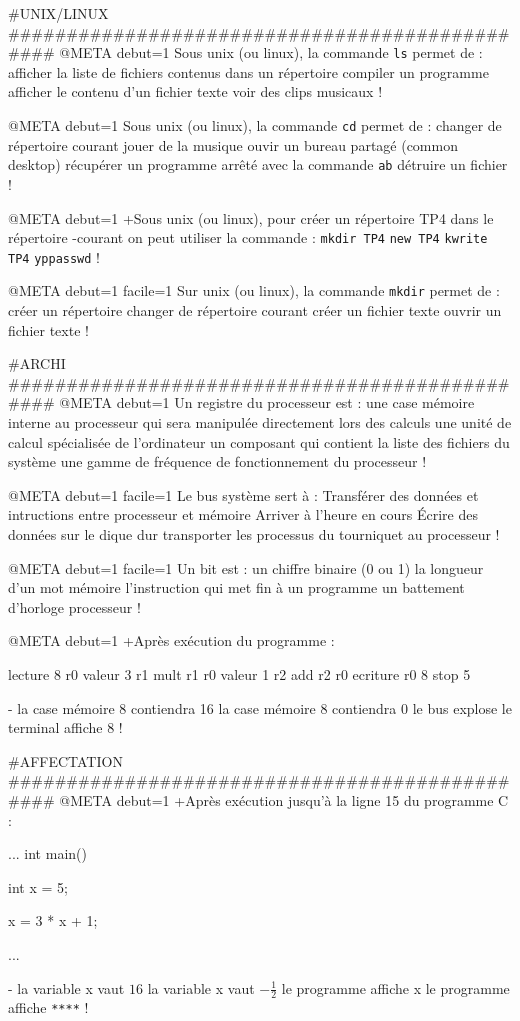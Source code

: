 #UNIX/LINUX ###############################################
@META debut=1
Sous unix (ou linux), la commande \verb|ls| permet de :
 afficher la liste de fichiers contenus dans un répertoire
 compiler un programme
 afficher le contenu d'un fichier texte
 voir des clips musicaux
!

@META debut=1
Sous unix (ou linux), la commande \verb|cd| permet de :
 changer de répertoire courant
 jouer de la musique
 ouvir un bureau partagé (common desktop)
 récupérer un programme arrêté avec la commande \verb|ab|
 détruire un fichier
!

@META debut=1
+Sous unix (ou linux), pour créer un répertoire TP4 dans le répertoire
-courant on peut utiliser la commande :
 \verb+mkdir TP4+
 \verb+new TP4+
 \verb+kwrite TP4+
 \verb+yppasswd+
!

@META debut=1 facile=1
Sur unix (ou linux), la commande \verb|mkdir| permet de :
  créer un répertoire
  changer de répertoire courant
  créer un fichier texte
  ouvrir un fichier texte
!



#ARCHI ###############################################
@META debut=1
Un registre du processeur est :
 une case mémoire interne au processeur qui sera manipulée directement lors des calculs
 une unité de calcul spécialisée de l'ordinateur
 un composant qui contient la liste des fichiers du système
 une gamme de fréquence de fonctionnement du processeur
!

@META debut=1 facile=1
Le bus système sert à :
 Transférer des données et intructions entre processeur et mémoire
 Arriver à l'heure en cours
 Écrire des données sur le dique dur
 transporter les processus du tourniquet au processeur
!

@META debut=1 facile=1
Un bit est :
 un chiffre binaire (0 ou 1)
 la longueur d'un mot mémoire
 l'instruction qui met fin à un programme
 un battement d'horloge processeur
!


@META debut=1
+Après exécution du programme :
\begin{listing}{1}
lecture 8 r0
valeur 3 r1
mult r1 r0
valeur 1 r2
add r2 r0
ecriture r0 8
stop
5
\end{listing}
-
 la case mémoire 8 contiendra 16
 la case mémoire 8 contiendra 0
 le bus explose
 le terminal affiche 8
!

#AFFECTATION ###############################################
@META debut=1
+Après exécution jusqu'à la ligne 15 du programme  C :
\begin{listing}{10}
...
int main() {
    int x = 5;

    x = 3 * x + 1;

    ...
}
\end{listing}
-
 la variable x vaut $16$
 la variable x vaut $-\frac{1}{2}$
 le programme affiche x
 le programme affiche \verb+****+
!

